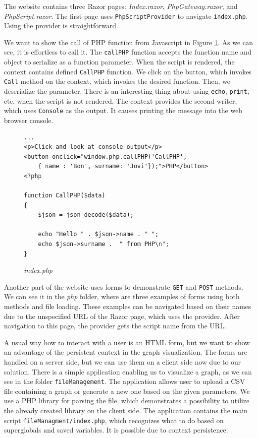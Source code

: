 The website contains three Razor pages: \textit{Index.razor}, \textit{PhpGateway.razor}, and \textit{PhpScript.razor}.
The first page uses \texttt{PhpScriptProvider} to navigate \texttt{index.php}.
Using the provider is straightforward.
\par
We want to show the call of PHP function from Javascript in Figure \ref{img26:index}.
As we can see, it is effortless to call it.
The \texttt{callPHP} function accepts the function name and object to serialize as a function parameter.
When the script is rendered, the context contains defined \texttt{CallPHP} function.
We click on the button, which invokes \texttt{Call} method on the context, which invokes the desired function.
Then, we deserialize the parameter.
There is an interesting thing about using \texttt{echo}, \texttt{print}, etc. when the script is not rendered.
The context provides the second writer, which uses \texttt{Console} as the output.
It causes printing the message into the web browser console.
\begin{figure}
\begin{lstlisting}
...
<p>Click and look at console output</p>
<button onclick="window.php.callPHP('CallPHP',
	{ name : 'Bon', surname: 'Jovi'});">PHP</button>
<?php

function CallPHP($data)
{
    $json = json_decode($data); 

	echo "Hello " . $json->name . " ";
	echo $json->surname .  " from PHP\n";
}
\end{lstlisting}
\caption{\textit{index.php}}
\label{img26:index}
\end{figure}
\par
Another part of the website uses forms to demonstrate \texttt{GET} and \texttt{POST} methods.
We can see it in the \textit{php} folder, where are three examples of forms using both methods and file loading.
These examples can be navigated based on their names due to the unspecified URL of the Razor page, which uses the provider.
After navigation to this page, the provider gets the script name from the URL.
\par
A usual way how to interact with a user is an HTML form, but we want to show an advantage of the persistent context in the graph visualization.
The forms are handled on a server side, but we can use them on a client side now due to our solution.
There is a simple application enabling us to visualize a graph, as we can see in the folder \texttt{fileManagement}.
The application allows user to upload a CSV file containing a graph or generate a new one based on the given parameters.
We use a PHP library for parsing the file, which demonstrates a possibility to utilize the already created library on the client side.
The application contains the main script \texttt{fileManagment/index.php}, which recognizes what to do based on superglobals and saved variables.
It is possible due to context persistence.

